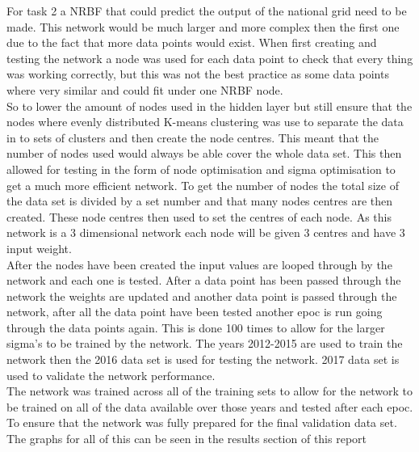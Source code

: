 \documentclass{IEEEtran}[11pt]
\begin{document}
\begin{flushleft}
  For task 2 a NRBF that could predict the output of the national grid need to
  be made. This network would be much larger and more complex then the first one
  due to the fact that more data points would exist. When first creating and
  testing the network a node was used for each data point to check that every
  thing was working correctly, but this was not the best practice as some data
  points where very similar and could fit under one NRBF node.
  \\
  \vspace{2.5mm}
  So to lower the amount of nodes used in the hidden layer but still ensure
  that the nodes where evenly distributed K-means clustering was use to separate
  the data in to sets of clusters and then create the node centres. This meant
  that the number of nodes used would always be able cover the whole data set.
  This then allowed for testing in the form of node optimisation and sigma
  optimisation to get a much more efficient network. To get the number of nodes
  the total size of the data set is divided by a set number and that many nodes
  centres are then created. These node centres then used to set the centres of
  each node. As this network is a 3 dimensional network each node will be given
  3 centres and have 3 input weight.
  \\
  \vspace{2.5mm}
  After the nodes have been created the input values are looped through by the
  network and each one is tested. After a data point has been passed through the
  network the weights are updated and another data point is passed through the
  network, after all the data point have been tested another epoc is run going
  through the data points again. This is done 100 times to allow for the larger
  sigma's to be trained by the network. The years 2012-2015 are used to train
  the network then the 2016 data set is used for testing the network. 2017 data
  set is used to validate the network performance.
  \\
  \vspace{2.5mm}
  The network was trained across all of the training sets to allow for the network
  to be trained on all of the data available over those years and tested after
  each epoc. To ensure that the network was fully prepared for the final
  validation data set.
  \\
  \vspace{1.5mm}
  The graphs for all of this can be seen in the results section of this report

\end{flushleft}
\end{document}
